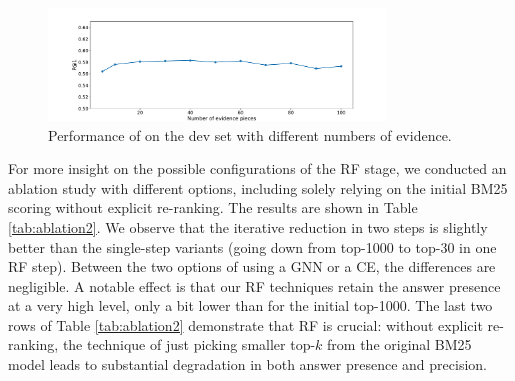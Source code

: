 \begin{figure}[t]
    \centering
    \includegraphics[width=0.8\textwidth]{submissions/Gerhard2024/figures/p_at_1-line_with_evidences.pdf}
    \vspace*{-0.2cm}
    \caption{Performance of \method on the \compmix dev set with different numbers of evidence.}
    \label{fig:res-num-evidences}
    \vspace*{-0.2cm}
\end{figure}



 For more insight on the possible configurations of the RF stage, we conducted an ablation study with different options, including solely relying on the initial BM25 scoring without explicit re-ranking. The results are shown in Table \ref{tab:ablation2}. We observe that the iterative reduction in two steps is slightly better than the single-step variants (going down from top-1000 to top-30 in one RF step). Between the two options of using a GNN or a CE, the differences are negligible. A notable effect is that our RF techniques retain the answer presence at a very high level, only a bit lower than for the initial top-1000. 
The last two rows of Table \ref{tab:ablation2} demonstrate that RF is crucial: without explicit re-ranking, the technique of just picking smaller top-$k$ from the original BM25 model leads to substantial degradation in both answer presence and precision. 


